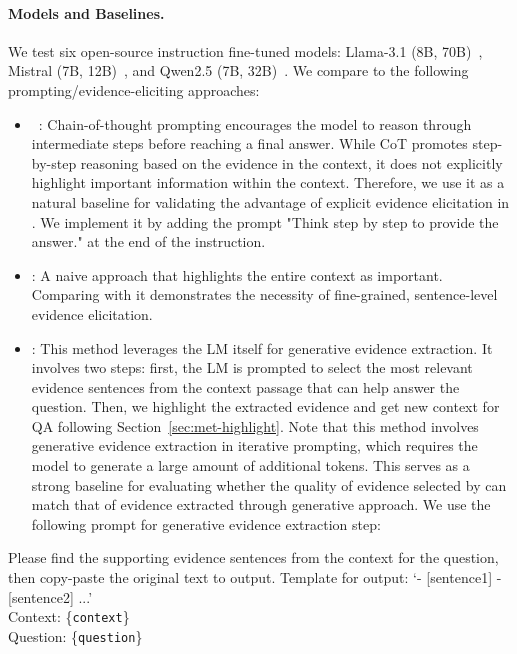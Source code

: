 \paragraph{Models and Baselines.}
We test six open-source instruction fine-tuned models: Llama-3.1 (8B, 70B)~\cite{dubey2024llama}, Mistral (7B, 12B)~\cite{jiang2023mistral}, and Qwen2.5 (7B, 32B)~\cite{yang2024qwen}.
We compare \se to the following prompting/evidence-eliciting approaches:
\begin{itemize}
    \item \co~\cite{wei2022chain}: Chain-of-thought prompting encourages the model to reason through intermediate steps before reaching a final answer. 
    While CoT promotes step-by-step reasoning based on the evidence in the context, it does not explicitly highlight important information within the context. 
    Therefore, we use it as a natural baseline for validating the advantage of explicit evidence elicitation in \se.
    We implement it by adding the \co prompt "Think step by step to provide the answer." at the end of the instruction.
    \item \fe: A naive approach that highlights the entire context as important. Comparing with it demonstrates the necessity of fine-grained, sentence-level evidence elicitation.
    \item \pe: This method leverages the LM itself for generative evidence extraction. 
    It involves two steps: first, the LM is prompted to select the most relevant evidence sentences from the context passage that can help answer the question. 
    Then, we highlight the extracted evidence and get new context for QA following Section~\ref{sec:met-highlight}. 
    Note that this method involves generative evidence extraction in iterative prompting, which requires the model to generate a large amount of additional tokens.
    This serves as a strong baseline for evaluating whether the quality of evidence selected by \se can match that of evidence extracted through generative approach. We use the following prompt for generative evidence extraction step:
\end{itemize}
\vspace{-5pt}
\begin{tcolorbox}[title={\footnotesize \pe Prompt Template $\tau_\texttt{PE}$},top=1mm,bottom=1mm]
\scriptsize
Please find the supporting evidence sentences from the context for the question, then copy-paste the original text to output. Template for output: `- [sentence1] - [sentence2] ...'\\
Context: \{\texttt{context}\}\\
Question: \{\texttt{question}\}
\end{tcolorbox}
